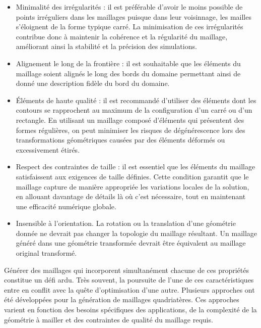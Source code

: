 \begin{itemize}
    \item Minimalité des irrégularités : il est préférable d'avoir le moins possible de points irréguliers dans les maillages puisque dans leur voisinnage, les mailles s'éloignent de la forme typique carré. La minimisation de ces irrégularités contribue donc à maintenir la cohérence et la régularité du maillage, améliorant ainsi la stabilité et la précision des simulations.\\
    \item Alignement le long de la frontière : il est souhaitable que les éléments du maillage soient alignés le long des bords du domaine permettant ainsi de donné une description fidèle du bord du domaine.\\
    \item Éléments de haute qualité : il est recommandé d'utiliser des éléments dont les contours se rapprochent au maximum de la configuration d'un carré ou d'un rectangle. En utilisant un maillage composé d'éléments qui présentent des formes régulières, on peut minimiser les risques de dégénérescence lors des transformations géométriques causées par des éléments déformés ou excessivement étirés.\\
    \item Respect des contraintes de taille : il est essentiel que les éléments du maillage satisfaissent aux exigences de taille définies. Cette condition garantit que le maillage capture de manière appropriée les variations locales de la solution, en allouant davantage de détails là où c'est nécessaire, tout en maintenant une efficacité numérique globale.\\
    \item Insensible à l'orientation. La rotation ou la translation d'une géométrie donnée ne devrait pas changer la topologie du maillage résultant. Un maillage généré dans une géométrie transformée devrait être équivalent au maillage original transformé.\\
\end{itemize}

Générer des maillages qui incorporent simultanément chacune de ces propriétés constitue un défi ardu. Très souvent, la poursuite de l'une de ces caractéristiques entre en conflit avec la quête d'optimisation d'une autre. Plusieurs approches ont été développées pour la génération de maillages quadriatères. Ces approches varient en fonction des besoins spécifiques des applications, de la complexité de la géométrie à mailler et des contraintes de qualité du maillage requis. 

